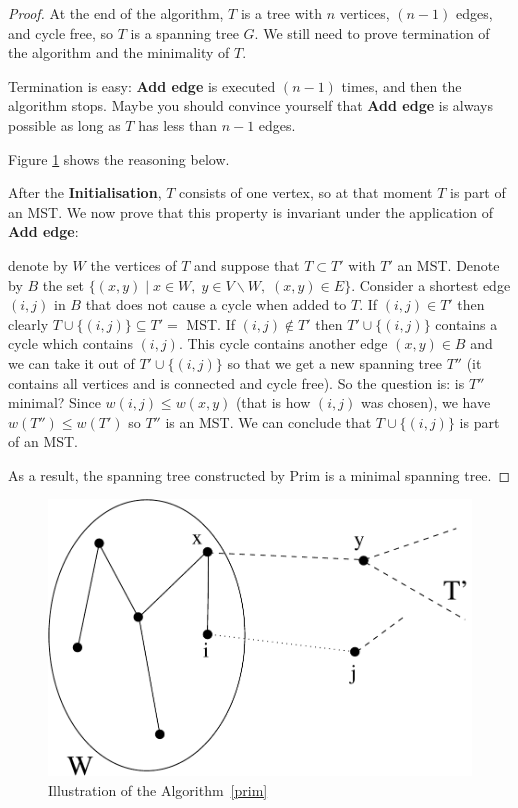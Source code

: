 \begin{proof}
At the end of the algorithm, $T$ is a tree with $n$ vertices,
$(n-1)$ edges, and cycle free, so $T$ is a spanning tree $G$. We still need to prove termination of the algorithm and the minimality of $T$.

Termination is easy: \textbf{Add edge} is executed $(n-1)$ times, and
then the algorithm stops. Maybe you should convince yourself that
\textbf{Add edge} is always possible as long as $T$ has less than
$n-1$ edges.

Figure \ref{prim2} shows the reasoning below.

After the \textbf{Initialisation}, $T$ consists of one vertex, so at
that moment $T$ is part of an MST. We now prove that this property
is invariant under the application of \textbf{Add edge}:

denote by $W$ the vertices of $T$ and suppose that $T \subset T'$ with
$T'$ an MST. Denote by $B$ the set
%
$\{(x,y)\;|\; x \in W,\; y \in V \backslash W,\; (x,y) \in E\}$.
%
Consider a shortest edge $(i,j)$ in $B$ that does not cause a cycle
when added to $T$. If $(i,j) \in T'$ then clearly $T \cup \{(i,j)\}
\subseteq T' = $ MST. If $(i,j) \notin T'$ then $T' \cup \{(i,j)\}$
contains a cycle which contains $(i,j)$.  This cycle contains another
edge $(x,y) \in B$ and we can take it out of $T' \cup \{(i,j)\}$ so
that we get a new spanning tree $T''$ (it contains all vertices and is
connected and cycle free). So the question is: is $T''$ minimal?
Since $w(i,j) \leq w(x,y)$ (that is how $(i,j)$ was chosen), we
have $w(T'') \leq w(T')$ so $T''$ is an MST. We can conclude that
$T \cup \{(i,j)\}$ is part of an MST.

As a result, the spanning tree constructed by Prim is a minimal
spanning tree.
\end{proof}

\begin{figure}[ht]
\begin{center}
\includegraphics[width=0.4\linewidth,keepaspectratio]{prim2}
\end{center}
\caption{Illustration of the Algorithm~\ref{prim} \label{prim2}}
\end{figure}


